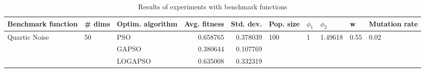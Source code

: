 \begin{table}
\centering
\caption{Results of experiments with benchmark functions}
\begin{tabular}{lllrrlllll}
\toprule
            Benchmark function &             \# dims & Optim. algorithm &  Avg. fitness &  Std. dev. &            Pop. size &         $\phi_{1}$ &               $\phi_{2}$ &                     w &         Mutation rate \\
\midrule
\multirow{3}{*}{Quartic Noise} & \multirow{3}{*}{50} &              PSO &      0.658765 &   0.378039 & \multirow{3}{*}{100} & \multirow{3}{*}{1} & \multirow{3}{*}{1.49618} & \multirow{3}{*}{0.55} & \multirow{3}{*}{0.02} \\
                               &                     &            GAPSO &      0.380644 &   0.107769 &                      &                    &                          &                       &                       \\
                               &                     &          LOGAPSO &      0.635008 &   0.332319 &                      &                    &                          &                       &                       \\
\bottomrule
\end{tabular}
\end{table}
